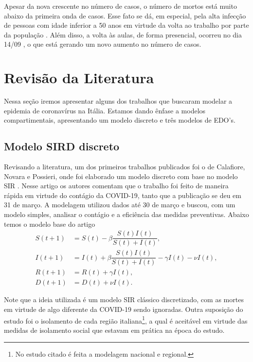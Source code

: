 \documentclass{article}
\begin{document}
	Apesar da nova crescente no número de casos, o número de mortos está muito abaixo da primeira onda de casos. Esse fato se dá, em especial, pela alta infecção de pessoas com idade inferior a 50 anos \cite{istoe_idade} em virtude da volta ao trabalho por parte da população \cite{folha_trabalho}. Além disso, a volta às aulas, de forma presencial, ocorreu no dia 14/09 \cite{uol_aulas}, o que está gerando um novo aumento no número de casos.
	
	\section{Revisão da Literatura}
	
	Nessa seção iremos apresentar alguns dos trabalhos que buscaram modelar a epidemia de coronavírus na Itália. Estamos dando ênfase a modelos compartimentais, apresentando um modelo discreto e três modelos de EDO's.
	
	\subsection{Modelo SIRD discreto}
	
	Revisando a literatura, um dos primeiros trabalhos publicados foi o de Calafiore, Novara e Possieri, onde foi elaborado um modelo discreto com base no modelo SIR \cite{calafiore2020modified}. Nesse artigo os autores comentam que o trabalho foi feito de maneira rápida em virtude do contágio da COVID-19, tanto que a publicação se deu em 31 de março. A modelagem utilizou dados até 30 de março e buscou, com um modelo simples, analisar o contágio e a eficiência das medidas preventivas. Abaixo temos o modelo base do artigo
	\begin{equation*}
		\begin{split}
			S(t + 1) & = S(t) - \beta \dfrac{S(t) I(t)}{S(t) + I(t)}, \\
			I(t + 1) & = I(t) + \beta \dfrac{S(t) I(t)}{S(t) + I(t)} - \gamma I(t) - \nu I(t), \\
			R(t + 1) & = R(t) + \gamma I(t), \\
			D(t + 1) & = D(t) + \nu I(t).
		\end{split}
	\end{equation*}
	
	Note que a ideia utilizada é um modelo SIR clássico discretizado, com as mortes em virtude de algo diferente da COVID-19 sendo ignoradas. Outra suposição do estudo foi o isolamento de cada região italiana\footnote{No estudo citado é feita a modelagem nacional e regional.}, a qual é aceitável em virtude das medidas de isolamento social que estavam em prática na época do estudo.
	
\end{document}
